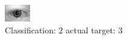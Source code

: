 \begin{figure}[h!]
\begin{center}
\includegraphics[width=0.60\columnwidth]{figures/ID672_class_2_target_3.png}
\end{center}
\caption{ Classification: 2 actual target: 3}
\label{fig:ID672_class_2_target_3}
\end{figure}
